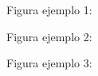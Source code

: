 \documentclass[12pt]{article}
\begin{document}
  Figura ejemplo 1:

  Figura ejemplo 2:

  Figura ejemplo 3:
\end{document}
